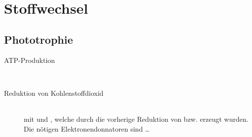 \section{Stoffwechsel}
\subsection{Phototrophie}
\begin{description}
	\item[ATP-Produktion]	\hfill \\
	\item[Reduktion von Kohlenstoffdioxid]	\hfill	\\
		mit  und ,
		welche durch die vorherige Reduktion von  bzw.  erzeugt wurden.
		Die nötigen Elektronendonnatoren sind \ldots
\end{description}
